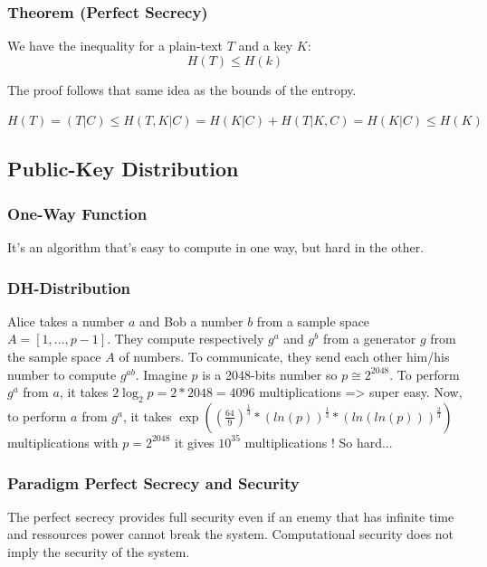 \documentclass{article}
\begin{document}
\subsubsection{Theorem (Perfect Secrecy)} 
\begin{tcolorbox}[sharp corners, colback=green!30, colframe=green!80!blue, title=Perfect Secrecy]
We have the inequality for a plain-text $ T $ and a key $ K $:
\begin{equation}
H(T) \leq H(k)
\end{equation}
\end{tcolorbox}
The proof follows that same idea as the bounds of the entropy.
\begin{tcolorbox}[width=12.1cm]
$ H(T) = (T | C) \leq H(T,K | C) = H(K | C) + H(T | K,C) = H(K | C) \leq H(K) $
\end{tcolorbox}

\subsection{Public-Key Distribution}
\subsubsection{One-Way Function} It's an algorithm that's easy to compute in one way, but hard in the other.

\subsubsection{DH-Distribution} Alice takes a number $ a $ and Bob a number $ b $ from a sample space $ A = [1,...,p-1]$. They compute respectively $ g^{a} $ and $ g^{b} $ from a generator $ g $ from the sample space $ A $ of numbers. To communicate, they send each other him/his number to compute $ g^{ab} $. Imagine $ p $ is a 2048-bits number so $ p \cong 2^{2048} $. To perform $ g^{a} $ from $ a $, it takes $ 2\log_{2}p = 2*2048 = 4096 $ multiplications => super easy. Now, to perform $ a $ from $ g^{a} $, it takes $ \exp((\frac{64}{9})^{\frac{1}{3}} * (ln(p))^{\frac{1}{3}} * (ln(ln(p)))^{\frac{2}{3}}) $ multiplications with $ p = 2^{2048} $ it gives $ 10^{35} $ multiplications ! So hard...

\subsubsection{Paradigm Perfect Secrecy and Security} The perfect secrecy provides full security even if an enemy that has infinite time and ressources power cannot break the system. Computational security does not imply the security of the system.
\end{document}

